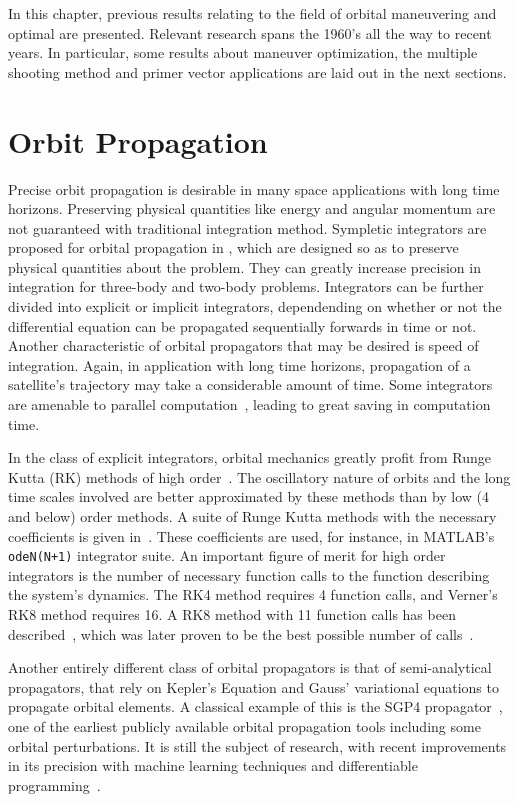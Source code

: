 
In this chapter, previous results relating to the field of orbital maneuvering and optimal are presented. Relevant research spans the 1960's all the way to recent years. In particular, some results about maneuver optimization, the multiple shooting method and primer vector applications are laid out in the next sections.

\section{Orbit Propagation}

Precise orbit propagation is desirable in many space applications with long time horizons. Preserving physical quantities like energy and angular momentum are not guaranteed with traditional integration method. Sympletic integrators are proposed for orbital propagation in , which are designed so as to preserve physical quantities about the problem. They can greatly increase precision in integration for three-body and two-body problems. Integrators can be further divided into explicit or implicit integrators, dependending on whether or not the differential equation can be propagated sequentially forwards in time or not. Another characteristic of orbital propagators that may be desired is speed of integration. Again, in application with long time horizons, propagation of a satellite's trajectory may take a considerable amount of time. Some integrators are amenable to parallel computation~\cite{implicit_rk}, leading to great saving in computation time.\

In the class of explicit integrators, orbital mechanics greatly profit from Runge Kutta (RK) methods of high order~\cite{num_int_orb}. The oscillatory nature of orbits and the long time scales involved are better approximated by these methods than by low (4 and below) order methods. A suite of Runge Kutta methods with the necessary coefficients is given in~. These coefficients are used, for instance, in MATLAB's \texttt{odeN(N+1)} integrator suite. An important figure of merit for high order integrators is the number of necessary function calls to the function describing the system's dynamics. The RK4 method requires 4 function calls, and Verner's RK8 method requires 16. A RK8 method with 11 function calls has been described~\cite{rk8_11calss}, which was later proven to be the best possible number of calls~\cite{non_existence_rk8_10calss}.

Another entirely different class of orbital propagators is that of semi-analytical propagators, that rely on Kepler's Equation and Gauss' variational equations to propagate orbital elements. A classical example of this is the SGP4 propagator~\cite{spacetrack_report_3_revisit}, one of the earliest publicly available orbital propagation tools including some orbital perturbations. It is still the subject of research, with recent improvements in its precision with machine learning techniques and differentiable programming~\cite{sgp4_high_precision}. 

